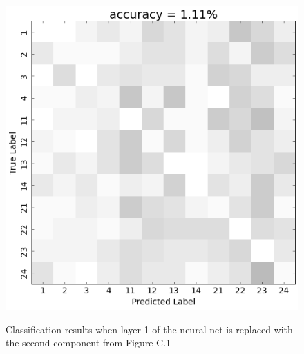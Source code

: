 \begin{figure}[h] 
  \begin{center}
    \includegraphics[scale=0.5]{Figures/PC1_confusion}
   \\\vspace{-0.8em}
    \caption{Classification results when layer 1 of the neural net is replaced with the second component from Figure C.1}
    \label{fig:PC1_confusion}
  \end{center}
  \vspace{-1em}
\end{figure}

